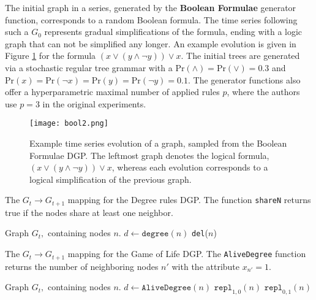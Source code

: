 The initial graph in a series, generated by the \textbf{Boolean Formulae} generator function, corresponds to a random Boolean formula. The time series following such a $G_{0}$ represents gradual simplifications of the formula, ending with a logic graph that can not be simplified any longer. An example evolution is given in Figure \ref{fig:bool} for the formula  $(x \lor (y \land \lnot y)) \lor x$. The initial trees are generated via a stochastic regular tree grammar with a $\text{Pr}(\land) = \text{Pr}(\lor) = 0.3$ and $\text{Pr}(x) = \text{Pr}(\lnot x) = \text{Pr}(y) = \text{Pr}(\lnot y) = 0.1$. The generator functions also offer a hyperparametric maximal number of applied rules $p$, where the authors use $p=3$ in the original experiments.

\begin{figure}
    \centering
    \texttt{[image: bool2.png]}
    \caption{Example time series evolution of a graph, sampled from the Boolean Formulae DGP. The leftmost graph denotes the logical formula, $(x \lor (y \land \lnot y)) \lor x$, whereas each evolution corresponds to a logical simplification of the previous graph. }
    \label{fig:bool}
\end{figure}


\begin{algorithm}[H]
\centering
\caption{The $G_{t} \to G_{t+1}$ mapping for the Degree rules DGP. The function \texttt{shareN} returns true if the nodes share at least one neighbor.}\label{alg:degree}
\begin{algorithmic}[1]
\Require Graph $G_{t},$ containing nodes $n$.
\State $d \gets \texttt{degree}(n)$
 \texttt{del}($n$)
\EndMyFor
{}
\EndIf
\EndMyFor
\EndMyFor
\end{algorithmic}
\end{algorithm}


\begin{algorithm}[H]
    \centering
    \caption{The $G_{t} \to G_{t+1}$ mapping for the Game of Life DGP. The \texttt{AliveDegree} function returns the number of neighboring nodes $n'$ with the attribute $x_{n'}=1$. }\label{alg:gol}
   \begin{algorithmic}[1]
\Require $\text{Graph } G_{t}, $ containing nodes $n$.
    \State $d \gets \texttt{AliveDegree}(n)$
        \State $\texttt{repl}_{1,0}(n)$
        \State $\texttt{repl}_{0,1}(n)$
\EndIf
\EndMyFor
\end{algorithmic}
\end{algorithm}


